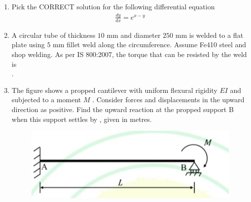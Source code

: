 \documentclass[journal,12pt,onecolumn]{article}
\theoremstyle{remark}
\begin{document}
\begin{enumerate}
    \hfill{}
    
    \item Pick the CORRECT solution for the following differential equation
    \begin{align}
    \frac{dy}{dx} = e^{x-y} 
    \end{align}

    \hfill{}
    \begin{enumerate}
    \end{enumerate}

    \item A circular tube of thickness $10$ mm and diameter $250$ mm is welded to a flat plate using $5$ mm fillet weld along the circumference. Assume Fe410 steel and shop welding.
    As per IS 800:2007, the torque that can be resisted by the weld  is \underline{\hspace{2cm}} \\ .

    \hfill{}
    \begin{enumerate}
    \end{enumerate}

    \item The figure  shows a propped cantilever with uniform flexural rigidity $EI$  and subjected to a moment $M$ . Consider forces and displacements in the upward direction as positive.
    Find the upward reaction at the propped support B  when this support settles by \brak{-\Delta}, given in metres.
    \begin{figure}[H]
        \centering
        \includegraphics[width=0.7\columnwidth]{figs/2q-38.jpg}
        \caption{}
        \label{fig:q38}
    \end{figure}


\end{enumerate}
\end{document}
